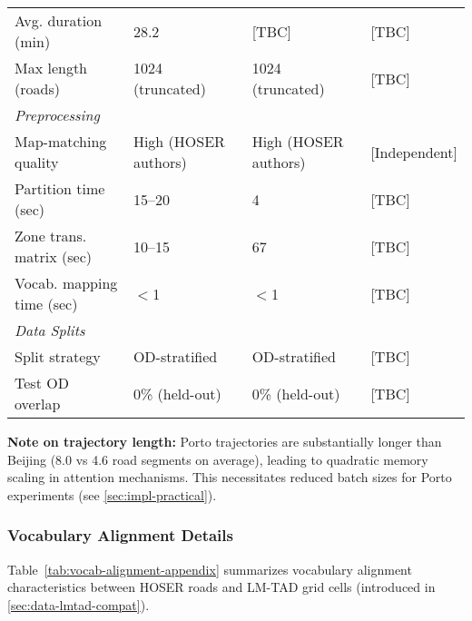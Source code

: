\begin{table}[H]
\begin{tabular}{llll}
        \quad Avg. duration (min)       & 28.2                    & [TBC]                 & [TBC]         \\
        \quad Max length (roads)        & 1024 (truncated)        & 1024 (truncated)      & [TBC]         \\
        \midrule
        \multicolumn{4}{l}{\textit{Preprocessing}}                                                        \\
        \quad Map-matching quality      & High (HOSER authors)    & High (HOSER authors)  & [Independent] \\
        \quad Partition time (sec)      & 15--20                  & 4                     & [TBC]         \\
        \quad Zone trans. matrix (sec)  & 10--15                  & 67                    & [TBC]         \\
        \quad Vocab. mapping time (sec) & $<$1                    & $<$1                  & [TBC]         \\
        \midrule
        \multicolumn{4}{l}{\textit{Data Splits}}                                                          \\
        \quad Split strategy            & OD-stratified           & OD-stratified         & [TBC]         \\
        \quad Test OD overlap           & 0\% (held-out)          & 0\% (held-out)        & [TBC]         \\
        \bottomrule
    \end{tabular}
\end{table}

\textbf{Note on trajectory length:} Porto trajectories are substantially longer than Beijing (8.0 vs 4.6 road segments on average), leading to quadratic memory scaling in attention mechanisms. This necessitates reduced batch sizes for Porto experiments (see \autoref{sec:impl-practical}).

\subsubsection{Vocabulary Alignment Details}
\label{app:vocab-stats}

Table~\ref{tab:vocab-alignment-appendix} summarizes vocabulary alignment characteristics between HOSER roads and LM-TAD grid cells (introduced in \autoref{sec:data-lmtad-compat}).

